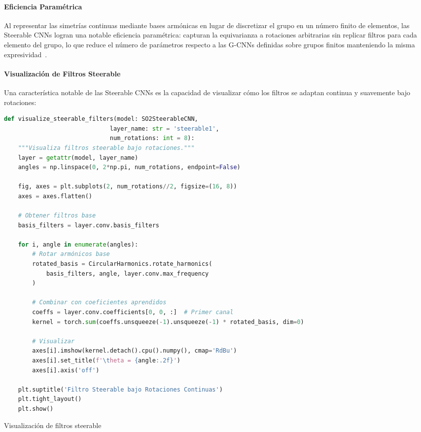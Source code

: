 \paragraph{Eficiencia Paramétrica}

Al representar las simetrías continuas mediante bases armónicas en lugar de discretizar el grupo en un número finito de elementos, las Steerable CNNs logran una notable eficiencia paramétrica: capturan la equivarianza a rotaciones arbitrarias sin replicar filtros para cada elemento del grupo, lo que reduce el número de parámetros respecto a las G-CNNs definidas sobre grupos finitos manteniendo la misma expresividad~\citep{weiler2019general}.

\paragraph{Visualización de Filtros Steerable}

Una característica notable de las Steerable CNNs es la capacidad de visualizar cómo los filtros se adaptan continua y suavemente bajo rotaciones:

\begin{listing}[h]
\begin{lstlisting}[language=Python]
def visualize_steerable_filters(model: SO2SteerableCNN, 
                              layer_name: str = 'steerable1',
                              num_rotations: int = 8):
    """Visualiza filtros steerable bajo rotaciones."""
    layer = getattr(model, layer_name)
    angles = np.linspace(0, 2*np.pi, num_rotations, endpoint=False)
    
    fig, axes = plt.subplots(2, num_rotations//2, figsize=(16, 8))
    axes = axes.flatten()
    
    # Obtener filtros base
    basis_filters = layer.conv.basis_filters
    
    for i, angle in enumerate(angles):
        # Rotar armónicos base
        rotated_basis = CircularHarmonics.rotate_harmonics(
            basis_filters, angle, layer.conv.max_frequency
        )
        
        # Combinar con coeficientes aprendidos
        coeffs = layer.conv.coefficients[0, 0, :]  # Primer canal
        kernel = torch.sum(coeffs.unsqueeze(-1).unsqueeze(-1) * rotated_basis, dim=0)
        
        # Visualizar
        axes[i].imshow(kernel.detach().cpu().numpy(), cmap='RdBu')
        axes[i].set_title(f'\theta = {angle:.2f}')
        axes[i].axis('off')
    
    plt.suptitle('Filtro Steerable bajo Rotaciones Continuas')
    plt.tight_layout()
    plt.show()
\end{lstlisting}
\caption{Visualización de filtros steerable}
\label{code:visualize_steerable}
\end{listing}

